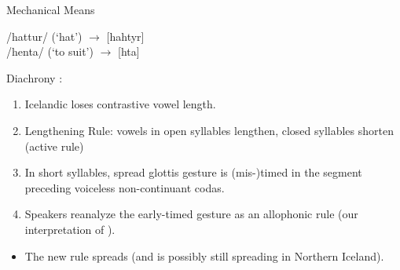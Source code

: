 \documentclass[hyperref={pdfpagelabels=false}]{beamer}
\begin{document}
\begin{frame}{Mechanical Means}

		\begin{center}
		/hattur/ (`hat') $\rightarrow$ [hahtyr]\\ /henta/ (`to suit') $\rightarrow$ [h\textepsilon{}ta]
		\end{center}
		 Diachrony \citep{kristjan1980, kristjan1986}:
		\begin{enumerate}
			\item Icelandic loses contrastive vowel length.
			\item Lengthening Rule: vowels in open syllables lengthen, closed syllables shorten (active rule)
			\item In short syllables, spread glottis gesture is (mis-)timed in the segment preceding voiceless non-continuant codas.
			\item Speakers reanalyze the early-timed gesture as an allophonic rule (our interpretation of \citealt{kristjan1986}).
		\end{enumerate}
		\begin{itemize}
		\item The new rule spreads (and is possibly still spreading in Northern Iceland).
	\end{itemize}

\end{frame}
\end{document}
